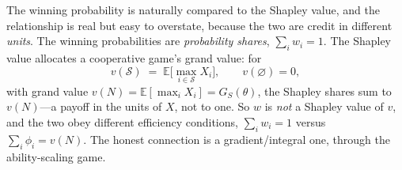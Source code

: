 \documentclass[11pt]{article}
\newcommand{\E}{\mathbb{E}}
\begin{document}
The winning probability is naturally compared to the Shapley value, and the
relationship is real but easy to overstate, because the two are credit in different
\emph{units}. The winning probabilities are \emph{probability shares},
$\sum_i w_i = 1$. The Shapley value allocates a cooperative game's grand value: for
\begin{equation}
  v(\mathcal S) \;=\; \E\Big[\max_{i\in\mathcal S} X_i\Big],
  \qquad v(\varnothing) = 0,
  \label{eq:game}
\end{equation}
with grand value $v(N) = \E[\max_i X_i] = G_S(\theta)$, the Shapley shares sum to
$v(N)$---a payoff in the units of $X$, not to one. So $w$ is \emph{not} a Shapley
value of $v$, and the two obey different efficiency conditions, $\sum_i w_i = 1$
versus $\sum_i \phi_i = v(N)$. The honest connection is a gradient/integral one,
through the ability-scaling game.
\end{document}
